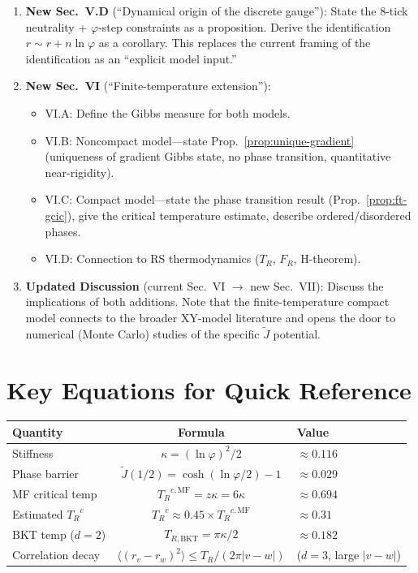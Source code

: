 \documentclass[11pt]{article}
\theoremstyle{definition}
\newcommand{\Jtilde}{\tilde{J}}
\newcommand{\TR}{{T_R}}
\newcommand{\FR}{{F_R}}
\newcommand{\phig}{\varphi}
\begin{document}
\begin{enumerate}
\item \textbf{New Sec.~V.D} (``Dynamical origin of the discrete gauge''): State the 8-tick neutrality + $\phig$-step constraints as a proposition. Derive the identification $r \sim r + n\ln\phig$ as a corollary. This replaces the current framing of the identification as an ``explicit model input.''

\item \textbf{New Sec.~VI} (``Finite-temperature extension''):
\begin{itemize}[nosep]
\item VI.A: Define the Gibbs measure for both models.
\item VI.B: Noncompact model---state Prop.~\ref{prop:unique-gradient} (uniqueness of gradient Gibbs state, no phase transition, quantitative near-rigidity).
\item VI.C: Compact model---state the phase transition result (Prop.~\ref{prop:ft-gcic}), give the critical temperature estimate, describe ordered/disordered phases.
\item VI.D: Connection to RS thermodynamics ($\TR$, $\FR$, H-theorem).
\end{itemize}

\item \textbf{Updated Discussion} (current Sec.~VI $\to$ new Sec.~VII): Discuss the implications of both additions. Note that the finite-temperature compact model connects to the broader XY-model literature and opens the door to numerical (Monte Carlo) studies of the specific $\Jtilde$ potential.
\end{enumerate}


\section{Key Equations for Quick Reference}
\label{sec:equations}

\begin{center}
\renewcommand{\arraystretch}{1.5}
\begin{tabular}{|l|c|l|}
\hline
\textbf{Quantity} & \textbf{Formula} & \textbf{Value} \\
\hline
Stiffness & $\kappa = (\ln\phig)^2/2$ & $\approx 0.116$ \\
Phase barrier & $\Jtilde(1/2) = \cosh(\ln\phig/2) - 1$ & $\approx 0.029$ \\
MF critical temp & $\TR^{c,\mathrm{MF}} = z\kappa = 6\kappa$ & $\approx 0.694$ \\
Estimated $\TR^c$ & $\TR^c \approx 0.45 \times \TR^{c,\mathrm{MF}}$ & $\approx 0.31$ \\
BKT temp ($d=2$) & $T_{R,\mathrm{BKT}} = \pi\kappa/2$ & $\approx 0.182$ \\
Correlation decay & $\langle(r_v-r_w)^2\rangle \leq \TR/(2\pi|v-w|)$ & ($d=3$, large $|v-w|$) \\
\hline
\end{tabular}
\end{center}
\end{document}
